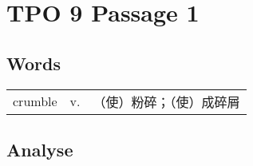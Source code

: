 \section{TPO 9 Passage 1}

\subsection{Words}

\begin{tabular}{lll}
    crumble & v. & （使）粉碎；（使）成碎屑 \\
\end{tabular}

\subsection{Analyse}

